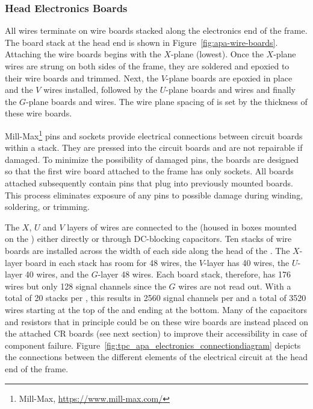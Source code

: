 \subsubsection{Head Electronics Boards}

All  wires terminate on wire boards stacked along the electronics end of the  frame.  The board stack at the head end is shown in Figure~\ref{fig:apa-wire-boards}. Attaching the wire boards begins with the $X$-plane (lowest). Once the $X$-plane wires are strung on both sides of the  frame, they are soldered and epoxied to their wire boards and trimmed. Next, the $V$-plane boards are epoxied in place and the $V$ wires installed, followed by the $U$-plane boards and wires and finally the $G$-plane boards and wires. The wire plane spacing of \planespace %
is set by the thickness of these wire boards.   

Mill-Max\footnote{Mill-Max\texttrademark{}, \url{https://www.mill-max.com/}} pins and sockets provide electrical connections between circuit boards within a stack. They are pressed into the circuit boards and are not repairable if damaged. To minimize the possibility of damaged pins, the boards are designed so that the first wire board attached to the frame has only sockets. All boards attached subsequently contain pins that plug into previously mounted boards. This process eliminates exposure of any pins to possible damage during winding, soldering, or trimming.

The $X$, $U$ and $V$ layers of wires are connected to the  (housed in boxes mounted on the ) either directly or through DC-blocking capacitors.  Ten stacks of wire boards are installed across the width of each side along the head of the .  The $X$-layer board in each stack has room for \num{48} wires, the $V$-layer has 40 wires, the $U$-layer \num{40} wires, and the $G$-layer \num{48} wires.  Each board stack, therefore, has \num{176} wires but only \num{128} signal channels since the $G$ wires are not read out. With a total of \num{20} stacks per , this results in \num{2560} signal channels per  and a total of \num{3520} wires starting at the top of the  and ending at the bottom. Many of the capacitors and resistors that in principle could be on these wire boards are instead placed on the attached CR boards (see next section) to improve their accessibility in case of component failure. Figure~\ref{fig:tpc_apa_electronics_connectiondiagram} depicts the connections between the different elements of the  electrical circuit at the head end of the frame. 

